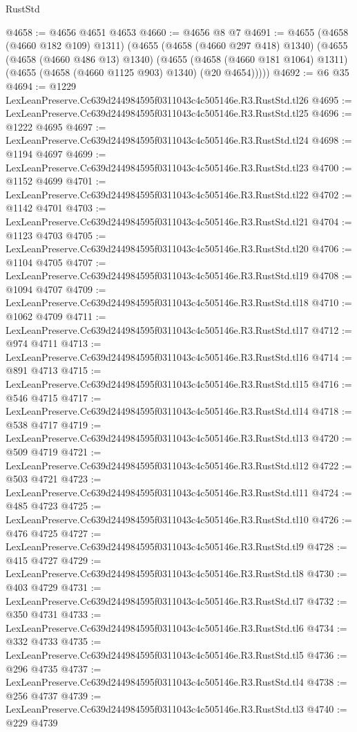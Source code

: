 \begin{lexlean}{RustStd}
\begin{coremodule}
@4658 := @4656 @4651 @4653
@4660 := @4656 @8 @7
@4691 := @4655
    (@4658 (@4660 @182 @109) @1311)
    (@4655
      (@4658 (@4660 @297 @418) @1340)
      (@4655
        (@4658 (@4660 @486 @13) @1340)
        (@4655
          (@4658 (@4660 @181 @1064) @1311)
          (@4655 (@4658 (@4660 @1125 @903) @1340) (@20 @4654)))))
@4692 := @6 @35
@4694 := @1229 LexLeanPreserve.Cc639d244984595f0311043c4c505146e.R3.RustStd.tl26
@4695 := LexLeanPreserve.Cc639d244984595f0311043c4c505146e.R3.RustStd.tl25
@4696 := @1222 @4695
@4697 := LexLeanPreserve.Cc639d244984595f0311043c4c505146e.R3.RustStd.tl24
@4698 := @1194 @4697
@4699 := LexLeanPreserve.Cc639d244984595f0311043c4c505146e.R3.RustStd.tl23
@4700 := @1152 @4699
@4701 := LexLeanPreserve.Cc639d244984595f0311043c4c505146e.R3.RustStd.tl22
@4702 := @1142 @4701
@4703 := LexLeanPreserve.Cc639d244984595f0311043c4c505146e.R3.RustStd.tl21
@4704 := @1123 @4703
@4705 := LexLeanPreserve.Cc639d244984595f0311043c4c505146e.R3.RustStd.tl20
@4706 := @1104 @4705
@4707 := LexLeanPreserve.Cc639d244984595f0311043c4c505146e.R3.RustStd.tl19
@4708 := @1094 @4707
@4709 := LexLeanPreserve.Cc639d244984595f0311043c4c505146e.R3.RustStd.tl18
@4710 := @1062 @4709
@4711 := LexLeanPreserve.Cc639d244984595f0311043c4c505146e.R3.RustStd.tl17
@4712 := @974 @4711
@4713 := LexLeanPreserve.Cc639d244984595f0311043c4c505146e.R3.RustStd.tl16
@4714 := @891 @4713
@4715 := LexLeanPreserve.Cc639d244984595f0311043c4c505146e.R3.RustStd.tl15
@4716 := @546 @4715
@4717 := LexLeanPreserve.Cc639d244984595f0311043c4c505146e.R3.RustStd.tl14
@4718 := @538 @4717
@4719 := LexLeanPreserve.Cc639d244984595f0311043c4c505146e.R3.RustStd.tl13
@4720 := @509 @4719
@4721 := LexLeanPreserve.Cc639d244984595f0311043c4c505146e.R3.RustStd.tl12
@4722 := @503 @4721
@4723 := LexLeanPreserve.Cc639d244984595f0311043c4c505146e.R3.RustStd.tl11
@4724 := @485 @4723
@4725 := LexLeanPreserve.Cc639d244984595f0311043c4c505146e.R3.RustStd.tl10
@4726 := @476 @4725
@4727 := LexLeanPreserve.Cc639d244984595f0311043c4c505146e.R3.RustStd.tl9
@4728 := @415 @4727
@4729 := LexLeanPreserve.Cc639d244984595f0311043c4c505146e.R3.RustStd.tl8
@4730 := @403 @4729
@4731 := LexLeanPreserve.Cc639d244984595f0311043c4c505146e.R3.RustStd.tl7
@4732 := @350 @4731
@4733 := LexLeanPreserve.Cc639d244984595f0311043c4c505146e.R3.RustStd.tl6
@4734 := @332 @4733
@4735 := LexLeanPreserve.Cc639d244984595f0311043c4c505146e.R3.RustStd.tl5
@4736 := @296 @4735
@4737 := LexLeanPreserve.Cc639d244984595f0311043c4c505146e.R3.RustStd.tl4
@4738 := @256 @4737
@4739 := LexLeanPreserve.Cc639d244984595f0311043c4c505146e.R3.RustStd.tl3
@4740 := @229 @4739

\end{coremodule}
\end{lexlean}
